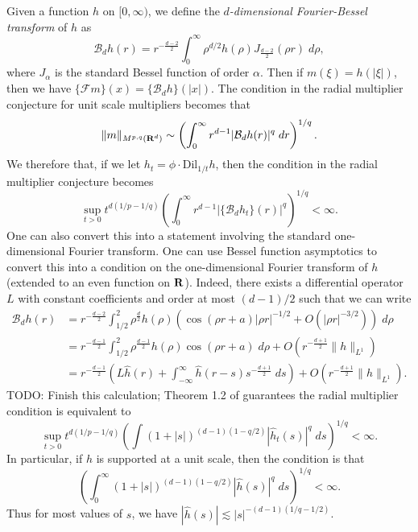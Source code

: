 \begin{remark}
    Given a function $h$ on $[0,\infty)$, we define the \emph{$d$-dimensional Fourier-Bessel transform} of $h$ as
    \[ \mathcal{B}_d h (r) = r^{- \frac{d-2}{2}} \int_0^\infty \rho^{d/2} h(\rho) J_{\frac{d-2}{2}}(\rho r)\; d\rho, \]
    where $J_\alpha$ is the standard Bessel function of order $\alpha$. Then if $m(\xi) = h(|\xi|)$, then we have $\{ \mathcal{F}m \}(x) = \{ \mathcal{B}_d h \} (|x|)$. The condition in the radial multiplier conjecture for unit scale multipliers becomes that
    \[ \| m \|_{M^{p,q}(\operatorname{\mathbf{R}}^d)} \sim \left( \int_0^\infty r^{d-1} |\mathcal{B}_d h(r)|^q\; dr \right)^{1/q}. \]
    We therefore that, if we let $h_t = \phi \cdot \text{Dil}_{1/t} h$, then the condition in the radial multiplier conjecture becomes
    \[ \sup_{t > 0} t^{d(1/p - 1/q)} \left( \int_0^\infty r^{d-1} |\{ \mathcal{B}_d h_t \}(r)|^q \right)^{1/q} < \infty. \]
    One can also convert this into a statement involving the standard one-dimensional Fourier transform. One can use Bessel function asymptotics to convert this into a condition on the one-dimensional Fourier transform of $h$ (extended to an even function on $\operatorname{\mathbf{R}}$). Indeed, there exists a differential operator $L$ with constant coefficients and order at most $(d-1)/2$ such that we can write
    \begin{align*}
        \mathcal{B}_d h(r) &= r^{- \frac{d-2}{2}} \int_{1/2}^2 \rho^{\frac{d}{2}} h(\rho) \left( \cos(\rho r + a) |\rho r|^{-1/2} + O(|\rho r|^{-3/2}) \right)\; d\rho\\
        &= r^{- \frac{d-1}{2}} \int_{1/2}^2 \rho^{\frac{d-1}{2}} h(\rho) \cos(\rho r + a)\; d\rho + O \left( r^{-\frac{d+1}{2}} \| h \|_{L^1} \right)\\
        &= r^{- \frac{d-1}{2}} \left( L \widehat{h}(r) + \int_{-\infty}^\infty \widehat{h}(r - s) s^{-\frac{d+1}{2}}\; ds \right) + O \left( r^{-\frac{d+1}{2}} \| h \|_{L^1} \right).
    \end{align*}
    TODO: Finish this calculation; Theorem 1.2 of \cite{GarrigosandSeeger} guarantees the radial multiplier condition is equivalent to 
    \[ \sup_{t > 0} t^{d(1/p - 1/q)} \left( \int (1 + |s|)^{(d-1)(1 - q/2)} |\widehat{h}_t(s)|^q\; ds \right)^{1/q} < \infty. \]
    In particular, if $h$ is supported at a unit scale, then the condition is that
    \[ \left( \int_0^\infty (1 + |s|)^{(d-1)(1 - q/2)} |\widehat{h}(s)|^q\; ds \right)^{1/q} < \infty. \]
    Thus for most values of $s$, we have $|\widehat{h}(s)| \lesssim |s|^{-(d-1)(1/q - 1/2)}$.

\end{remark}
